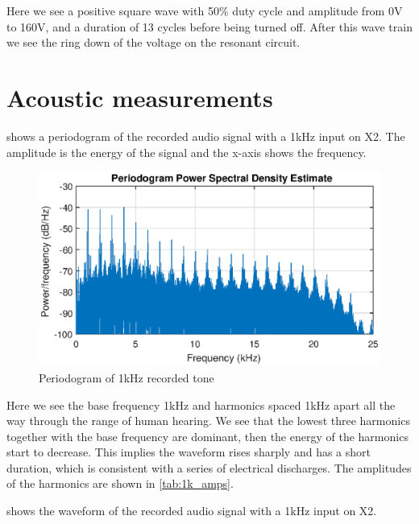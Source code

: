 Here we see a positive square wave with 50\% duty cycle and amplitude from 0V to 160V, and a duration of 13 cycles before being turned off. After this wave train we see the ring down of the voltage on the resonant circuit.

\newpage
\section{Acoustic measurements}

 shows a periodogram of the recorded audio signal with a 1kHz input on X2. The amplitude is the energy of the signal and the x-axis shows the frequency.
\begin{figure}[H]
    \centering
    \includegraphics[trim={0cm 1.6cm 0cm 2cm},clip,width=\textwidth]{img/Periodogram_1khz-09.eps}
    \caption{Periodogram of 1kHz recorded tone}
    \label{fig:period_1k}
\end{figure}

Here we see the base frequency 1kHz and harmonics spaced 1kHz apart all the way through the range of human hearing. We see that the lowest three harmonics together with the base frequency are dominant, then the energy of the harmonics start to decrease. This implies the waveform rises sharply and has a short duration, which is consistent with a series of electrical discharges. The amplitudes of the harmonics are shown in \cref{tab:1k_amps}.

 shows the waveform of the recorded audio signal with a 1kHz input on X2.

